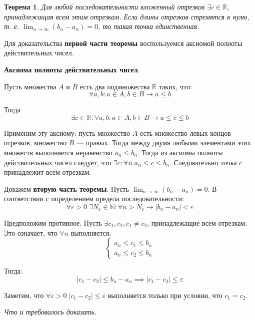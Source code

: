 \documentclass[a4paper,12pt,oneside]{extbook}
\newcommand{\newpar}{$ $\par\nobreak\ignorespaces}
\theoremstyle{numbered}
\theoremstyle{unnumbered}
\newtheorem*{theorem*}{Теорема}
\theoremstyle{named}
\theoremstyle{unnumbered}
\theoremstyle{named}
\theoremstyle{named}
\theoremstyle{named}
\renewenvironment{proof}[1][]{\breakenv[Доказательство]{\if\relax\detokenize{#1}\relax\else\;\fi}{\textbf{#1}}}{\smallskip\newpar \hfill\textit{Что и требовалось доказать.}}
\begin{document}
\begin{theorem*}
    Для любой последовательности вложенный отрезков \(\exists c \in \mathbb{R}\), принадлежащая всем этим отрезкам. Если длины отрезков стремятся к нулю, т. е. \(\displaystyle \lim_{n \to \infty}{(b_n - a_n)} = 0\), то такая точка единственная.
\end{theorem*}

\begin{proof}
    Для доказательства \textbf{первой части теоремы} воспользуемся аксиомой полноты действительных чисел.

    \textbf{Аксиома полноты действительных чисел}.

    Пусть множества \(A\) и \(B\) есть два подмножества \(\mathbb{R}\) таких, что:
    \[
        \forall a, b: a \in A, b \in B \rightarrow a \leq b
    \]

    Тогда
    \[
        \exists c \in \mathbb{R}: \forall a, b: a \in A, b \in B \rightarrow a \leq c \leq b
    \]

    Применим эту аксиому: пусть множество \(A\) есть множество левых концов отрезков, множество \(B\) — правых. Тогда между двумя любыми элементами этих множеств выполняется неравенство \(a_n \leq b_n\). Тогда из аксиомы полноты действительных чисел следует, что \(\exists c: \forall n \; a_n \leq c \leq b_n\). Следовательно точка \(c\) принадлежит всем отрезкам.

    Докажем \textbf{вторую часть теоремы}. Пусть \(\displaystyle \lim_{n \to \infty}{(b_n - a_n)} = 0\). В соответствии с определением предела последовательности:
    \[
        \forall \varepsilon > 0 \; \exists N_{\varepsilon} \in \mathbb{N}: \forall n > N_{\varepsilon} \rightarrow |b_n - a_n| < \varepsilon
    \]

    Предположим противное. Пусть \(\exists c_1, c_2, c_1 \neq c_2\), принадлежащие всем отрезкам. Это означает, что \(\forall n\) выполняется:
    \[
        \begin{cases}
            a_n \leq c_1 \leq b_n \\
            a_n \leq c_2 \leq b_n
        \end{cases}
    \]

    Тогда:
    \[
        |c_1 - c_2| \leq b_n - a_n \implies |c_1 - c_2| \leq \varepsilon
    \]

    Заметим, что \(\forall \varepsilon > 0 \; |c_1 - c_2| \leq \varepsilon\) выполняется только при условии, что \(c_1 = c_2\).
\end{proof}
\end{document}
